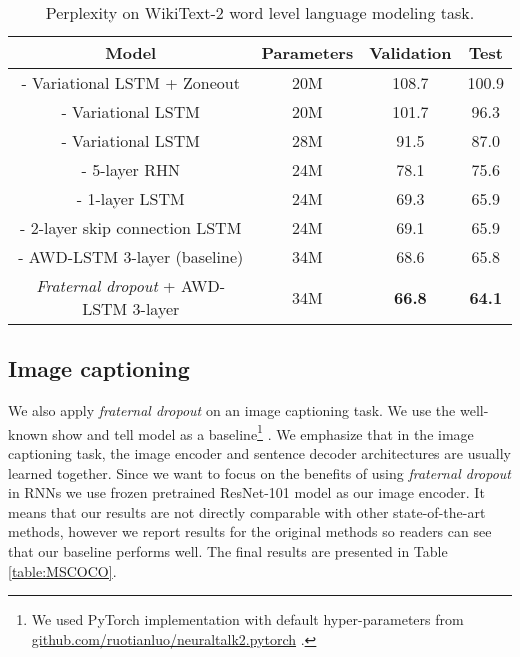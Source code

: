 \documentclass{article} \usepackage{iclr2018_conference,times}
\begin{document}
\begin{table}[t]
\vspace{-0.08cm}
\centering
\begin{tabular}{c | c c c} 
\textbf{Model} & \textbf{Parameters}  & \textbf{Validation} & \textbf{Test}\\
\hline
\cite{DBLP:journals/corr/MerityXBS16} - Variational LSTM + Zoneout & 20M & 108.7 & 100.9\\
\cite{DBLP:journals/corr/MerityXBS16} - Variational LSTM & 20M & 101.7 & 96.3\\
\cite{inan2016tying} - Variational LSTM & 28M & 91.5 & 87.0\\
\cite{melis2017state} - 5-layer RHN & 24M & 78.1 & 75.6\\
\cite{melis2017state} - 1-layer LSTM & 24M & 69.3 & 65.9\\
\cite{melis2017state} - 2-layer skip connection LSTM & 24M & 69.1 & 65.9\\
\hline
\cite{merity2017regularizing} - AWD-LSTM 3-layer (baseline) & 34M & 68.6 & 65.8\\
\hline
\emph{Fraternal dropout} + AWD-LSTM 3-layer & 34M & \textbf{66.8} & \textbf{64.1}\\
\end{tabular}
\caption{Perplexity on WikiText-2 word level language modeling task.}
\label{table:WT234Mfnt}
\vspace{-0.08cm}
\end{table}




\subsection{Image captioning}

We also apply \emph{fraternal dropout} on an image captioning task. We use the well-known show and tell model as a baseline\footnote{We used PyTorch implementation with default hyper-parameters from \url{github.com/ruotianluo/neuraltalk2.pytorch} .} \citep{DBLP:journals/corr/VinyalsTBE14}. We emphasize that in the image captioning task, the image encoder and sentence decoder architectures are usually learned together. Since we want to focus on the benefits of using \emph{fraternal dropout} in RNNs we use frozen pretrained ResNet-101 \citep{DBLP:journals/corr/HeZRS15} model as our image encoder. It means that our results are not directly comparable with other state-of-the-art methods, however we report results for the original methods so readers can see that our baseline performs well. The final results are presented in Table \ref{table:MSCOCO}.
\end{document}
